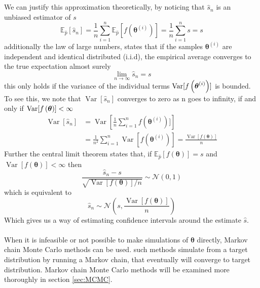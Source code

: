 \\
\\
We can justify this approximation theoretically, by noticing that $\hat{s}_n$ is an unbiased estimator of $s$
\begin{equation*}
    \mathbb{E}_{\hat{p}}\left[\hat{s}_{n}\right]=\frac{1}{n} \sum_{i=1}^{n} \mathbb{E}_{\hat{p}}\left[f\left(\boldsymbol{\theta}^{(i)}\right)\right]=\frac{1}{n} \sum_{i=1}^{n} s=s
\end{equation*}
additionally the law of large numbers, states that if the samples $\boldsymbol{\theta}^{(i)}$ are independent and identical distributed (i.i.d), the empirical average converges to the true expectation almost surely
\begin{equation*}
    \lim _{n \rightarrow \infty} \hat{s}_{n}=s
\end{equation*}
this only holds if the variance of the individual terms $\operatorname{Var}[f\left (\boldsymbol{\theta}^{(i)}\right)]$ is bounded. To see this, we note that $\operatorname{Var}[\hat{s}_n]$ converges to zero as n goes to infinity, if and only if $\operatorname{Var}[f\left (\boldsymbol{\theta}\right)]<\infty$
\begin{equation*}
    \begin{split}
\operatorname{Var}\left[\hat{s}_{n}\right] &=\operatorname{Var}\left[\frac{1}{n} \sum_{i=1}^{n} f(\boldsymbol{\theta}^{(i)})]\right] \\ &=\frac{1}{n^{2}} \sum_{i=1}^{n} \operatorname{Var}[f(\boldsymbol{\theta}^{(i)})]
=\frac{\operatorname{Var}[f(\boldsymbol{\theta})]}{n}
\end{split}
\end{equation*}
Further the central limit theorem states that, if $\mathbb{E}_{\hat{p}}[f(\boldsymbol{\theta})]=s$ and $\operatorname{Var}[f(\boldsymbol{\theta})]<\infty$ then
\begin{equation*}
    \frac{\hat{s}_{n}-s}{\sqrt{\operatorname{Var}[f(\boldsymbol{\theta})] / n}} \sim \mathcal{N}(0,1)
\end{equation*}
which is equivalent to
\begin{equation*}
    \hat{s}_n\sim \mathcal{N}\left(s,\frac{\operatorname{Var}[f(\boldsymbol{\theta})]}{n}\right)
\end{equation*}
Which gives us a way of estimating confidence intervals around the estimate $\hat{s}$. \\
\\
When it is infeasible or not possible to make simulations of $\boldsymbol{\theta}$ directly, Markov chain Monte Carlo methods can be used. such methods simulate from a target distribution by running a Markov chain, that eventually will converge to target distribution. Markov chain Monte Carlo methods will be examined more thoroughly in section \ref{sec:MCMC}.



